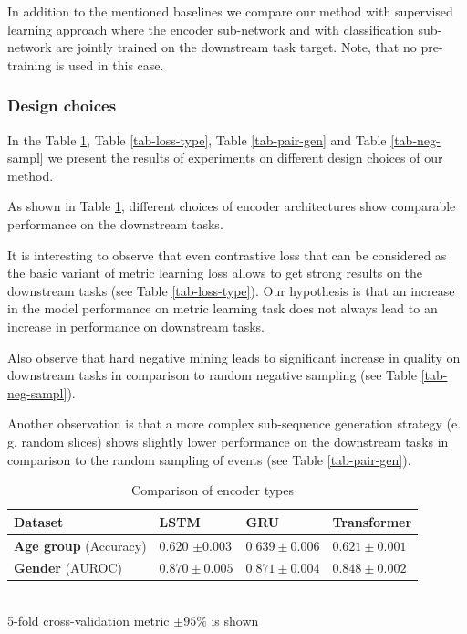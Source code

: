 \documentclass{article}
\begin{document}
In addition to the mentioned baselines we compare our method with supervised learning approach where the encoder sub-network and with classification sub-network are jointly trained on the downstream task target. Note, that no pre-training is used in this case.

\subsubsection{Design choices}

In the Table \ref{tab-enc-type}, Table \ref{tab-loss-type}, Table \ref{tab-pair-gen} and Table \ref{tab-neg-sampl} we present the results of experiments on different design choices of our method.

As shown in Table \ref{tab-enc-type}, different choices of encoder architectures show comparable performance on the downstream tasks.

It is interesting to observe that even contrastive loss that can be considered as the basic variant of metric learning loss allows to get strong results on the downstream tasks (see Table \ref{tab-loss-type}). Our hypothesis is that an increase in the model performance on metric learning task does not always lead to an increase in performance on downstream tasks.

Also observe that hard negative mining leads to significant increase in quality on downstream tasks in comparison to random negative sampling (see Table \ref{tab-neg-sampl}).

Another observation is that a more complex sub-sequence generation strategy (e. g. random slices) shows slightly lower performance on the downstream tasks in comparison to the random sampling of events (see Table \ref{tab-pair-gen}).

\begin{table}
\centering
\caption{Comparison of encoder types}
\begin{tabular}{llll}
\toprule
\textbf{Dataset} & \textbf{LSTM} & \textbf{GRU} & \textbf{Transformer} \\
\midrule
\textbf{Age group} \small{(Accuracy)} & 0.620 $\pm 0.003$ & $0.639 \pm 0.006$ & $0.621 \pm 0.001$ \\
\textbf{Gender} \small{(AUROC)} & $0.870 \pm 0.005$ & $0.871 \pm 0.004$ & $0.848 \pm 0.002$  \\
\bottomrule
\end{tabular} \\
\small{5-fold cross-validation metric $\pm 95\%$ is shown}
\label{tab-enc-type}
\end{table}
\end{document}
